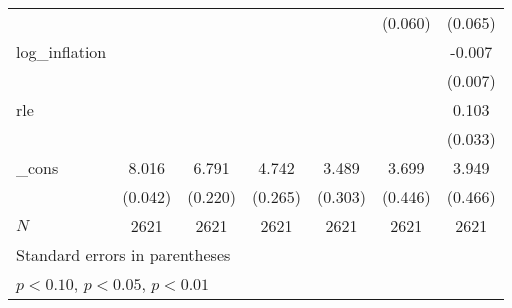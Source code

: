 {\begin{tabular}{l*{6}{c}}
            &                     &                     &                     &                     &     (0.060)         &     (0.065)         \\
\addlinespace
log\_inflation&                     &                     &                     &                     &                     &      -0.007         \\
            &                     &                     &                     &                     &                     &     (0.007)         \\
\addlinespace
rle         &                     &                     &                     &                     &                     &       0.103\sym{***}\\
            &                     &                     &                     &                     &                     &     (0.033)         \\
\addlinespace
\_cons      &       8.016\sym{***}&       6.791\sym{***}&       4.742\sym{***}&       3.489\sym{***}&       3.699\sym{***}&       3.949\sym{***}\\
            &     (0.042)         &     (0.220)         &     (0.265)         &     (0.303)         &     (0.446)         &     (0.466)         \\
\midrule
\(N\)       &        2621         &        2621         &        2621         &        2621         &        2621         &        2621         \\
\bottomrule
\multicolumn{7}{l}{\footnotesize Standard errors in parentheses}\\
\multicolumn{7}{l}{\footnotesize \sym{*} \(p<0.10\), \sym{**} \(p<0.05\), \sym{***} \(p<0.01\)}\\
\end{tabular}
}
